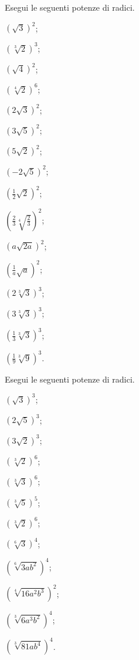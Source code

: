 \begin{esercizio}[\Ast]
 \label{ese:2.46}
Esegui le seguenti potenze di radici.
 \begin{multicols}{4}
 \begin{enumeratea}
 \item $\left(\sqrt 3\right)^2$;
 \item $\left(\sqrt[3]2\right)^3$;
 \item $\left(\sqrt 4\right)^2$;
 \item $\left(\sqrt[4]2\right)^6$;
 \item $\left(2\sqrt 3\right)^2$;
 \item $\left(3\sqrt 5\right)^2$;
 \item $\left(5\sqrt 2\right)^2$;
 \item $\left(-2\sqrt 5\right)^2$;
 \item $\left(\frac 1 2\sqrt 2\right)^2$;
 \item $\left(\frac 2 3\sqrt[4]{\frac 2 3}\right)^2$;
 \item $\left(a\sqrt{2a}\right)^2$;
 \item $\left(\frac 1 a\sqrt a\right)^2$;
 \item $\left(2\sqrt[3]3\right)^3$;
 \item $\left(3\sqrt[3]3\right)^3$;
 \item $\left(\frac 1 3\sqrt[3]3\right)^3$;
 \item $\left(\frac 1 9\sqrt[3]9\right)^3$.
 \end{enumeratea}
 \end{multicols}
\end{esercizio}

\begin{esercizio}[\Ast]
 \label{ese:2.47}
Esegui le seguenti potenze di radici.
 \begin{multicols}{4}
 \begin{enumeratea}
 \item $\left(\sqrt 3\right)^3$;
 \item $\left(2\sqrt 5\right)^3$;
 \item $\left(3\sqrt 2\right)^3$;
 \item $\left(\sqrt[3]2\right)^6$;
 \item $\left(\sqrt[3]3\right)^6$;
 \item $\left(\sqrt[3]5\right)^5$;
 \item $\left(\sqrt[3]2\right)^6$;
 \item $\left(\sqrt[6]3\right)^4$;
 \item $\left(\sqrt[6]{3ab^2}\right)^4$;
 \item $\left(\sqrt[4]{16a^2b^3}\right)^2$;
 \item $\left(\sqrt[3]{6a^3b^2}\right)^4$;
 \item $\left(\sqrt[3]{81ab^4}\right)^4$.
 \end{enumeratea}
 \end{multicols}
\end{esercizio}

